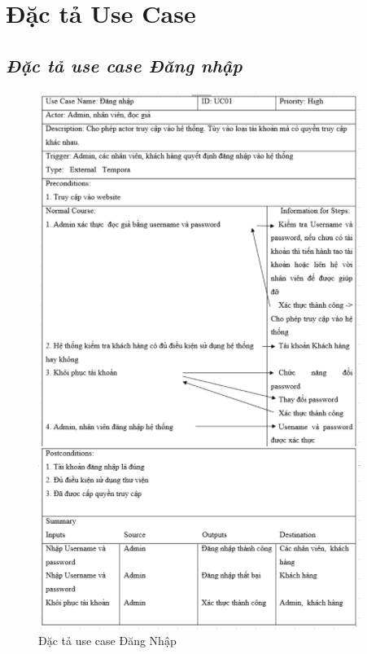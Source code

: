 \documentclass{report}
\begin{document}
\section{Đặc tả Use Case}
\subsection{\textit{Đặc tả use case Đăng nhập}}
\begin{figure}[htp]
    \centering
    \includegraphics[scale = 0.94]{image/UC01.PNG}
    \caption{Đặc tả use case Đăng Nhập}
\end{figure}
\end{document}
